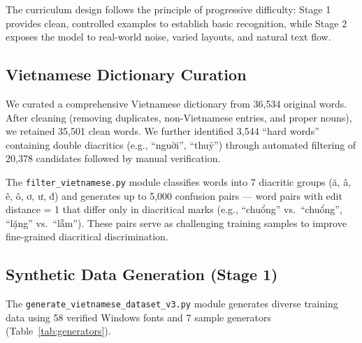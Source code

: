 \documentclass[11pt]{article}
\begin{document}
The curriculum design follows the principle of progressive difficulty: Stage 1 provides clean, controlled examples to establish basic recognition, while Stage 2 exposes the model to real-world noise, varied layouts, and natural text flow.

\subsection{Vietnamese Dictionary Curation}

We curated a comprehensive Vietnamese dictionary from 36,534 original words. 
After cleaning (removing duplicates, non-Vietnamese entries, and proper nouns), we retained 35,501 clean words. 
We further identified 3,544 ``hard words'' containing double diacritics (e.g., ``nguời'', ``thuỷ'') through automated filtering of 20,378 candidates followed by manual verification.

The \texttt{filter\_vietnamese.py} module classifies words into 7 diacritic groups (ă, â, ê, ô, ơ, ư, đ) and generates up to 5,000 confusion pairs --- word pairs with edit distance = 1 that differ only in diacritical marks (e.g., ``chuổng'' vs.\ ``chuổng'', ``lặng'' vs.\ ``lẫm''). 
These pairs serve as challenging training samples to improve fine-grained diacritical discrimination.

\subsection{Synthetic Data Generation (Stage 1)}

The \texttt{generate\_vietnamese\_dataset\_v3.py} module generates diverse training data using 58 verified Windows fonts and 7 sample generators (Table~\ref{tab:generators}).

\begin{table}[t]
\centering
\small
{}
\caption{Seven sample generators for Stage 1 synthetic data.}
\label{tab:generators}
\end{table}
\end{document}
